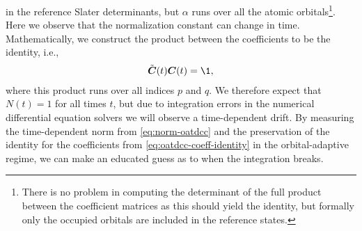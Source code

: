             in the reference Slater determinants, but $\alpha$ runs over all the
            atomic orbitals\footnote{%
                There is no problem in computing the determinant of the full
                product between the coefficient matrices as this should yield
                the identity, but formally only the occupied orbitals are
                included in the reference states.
            }.
            Here we observe that the normalization constant can change in time.
            Mathematically, we construct the product between the coefficients to
            be the identity, i.e.,
            \begin{align}
                \tilde{\vfg{C}}(t)\vfg{C}(t)
                = \1,
                \label{eq:oatdcc-coeff-identity}
            \end{align}
            where this product runs over all indices $p$ and $q$.
            We therefore expect that $N(t) = 1$ for all times $t$, but due to
            integration errors in the numerical differential equation solvers we
            will observe a time-dependent drift.
            By measuring the time-dependent norm from \autoref{eq:norm-oatdcc}
            and the preservation of the identity for the coefficients from
            \autoref{eq:oatdcc-coeff-identity} in the orbital-adaptive regime,
            we can make an educated guess as to when the integration breaks.

